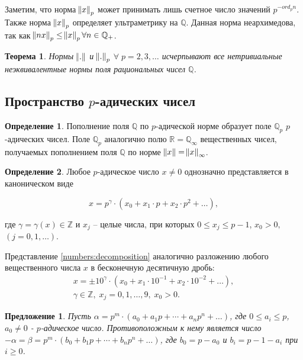\documentclass[master, och, diploma, times]{sty/SCWorks}
\theoremstyle{plain}
\newtheorem{thethm}{Теорема}[section]
\newtheorem{proposition}{Предложение}[section]
\theoremstyle{definition}
\newtheorem{defn}{Определение}[section]
\numberwithin{equation}{section}
\begin{document}
Заметим, что норма $\norm{x}_p$ может принимать лишь счетное число значений $p ^ {-ord_pn}$. Также норма $\norm{x}_p$ определяет ультраметрику на $\mathbb {Q}$. Данная норма неархимедова, так как $\norm{nx}_p \le \norm{x}_p \forall n \in \mathbb {Q}_{+}$.

\begin{thethm}
	Нормы $\norm{.}$ и $\norm{.}_p$ $\forall \; p = 2, 3, \dots$ исчерпывают все нетривиальные неэквивалентные нормы поля рациональных чисел $\mathbb {Q}$.
\end{thethm}


\subsection{Пространство $p$-адических чисел}

\begin{defn}
Пополнение поля $\mathbb {Q}$ по $p$-адической норме образует поле $\mathbb {Q}_p$ $p$-адических чисел. Поле $\mathbb {Q}_p$ аналогично полю $\mathbb {R} = \mathbb {Q}_{\infty}$ вещественных чисел, получаемых пополнением поля $\mathbb {Q}$ по норме $\norm{x}=\norm{x}_{\infty}$.
\end{defn}


\begin{defn}
Любое $p$-адическое число $x \ne 0$ однозначно представляется в каноническом виде

\begin{equation} \label{numbers:decomposition}
	x = p^{\gamma} \cdot (x_0 + x_1\cdot p + x_2 \cdot p^2 + \dots),
\end{equation}

\noindent где $\gamma = \gamma(x) \in \mathbb {Z}$ и $x_j$ -- целые числа, при которых $0 \le x_j \le p-1$, $x_0 > 0,$ \linebreak $(j=0,1,\dots)$. 
\end{defn}

Представление \eqref{numbers:decomposition} аналогично разложению любого вещественного числа $x$ в бесконечную десятичную дробь:
\begin{equation}
\begin{aligned}
	x=\pm10^\gamma \cdot (x_0 + x_1 \cdot 10^{-1} + x_2 \cdot 10^{-2} + \dots),\\
	\gamma \in \mathbb {Z}, \; x_j = 0, 1, \dots, 9, \; x_0 > 0.
\end{aligned}
\end{equation}

\begin{proposition}
Пусть $\alpha=p^m \cdot (a_0+a_1p+\cdots +a_np^n+\dots)$, где $0 \le a_i \le p$, $a_0 \neq 0$ - $p$-адическое число. Противоположным к нему является число \mbox{$- \alpha=\beta=p^m \cdot (b_0+b_1p+\cdots+b_np^n+\dots)$}, где $b_0=p-a_0$ и $b_i=p-1-a_i$ при $i \geq 0$.
\end{proposition}\label{adic:pros:minus}
\end{document}
